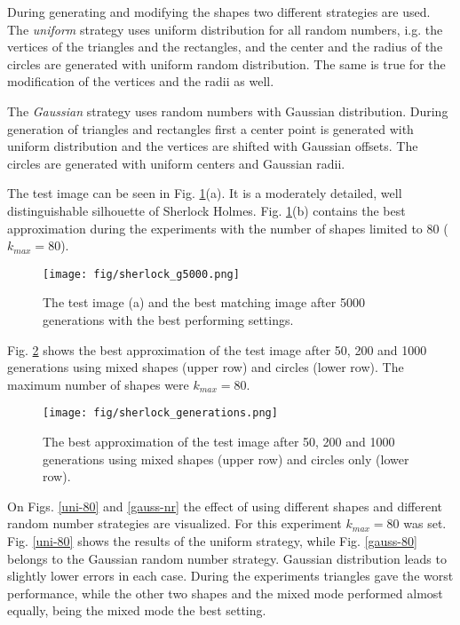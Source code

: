 \documentclass[conference]{IEEEtran}
\begin{document}
During generating and modifying the shapes two different strategies are used. The \emph{uniform}
strategy uses uniform distribution for all random numbers, i.g. the vertices of the triangles
and the rectangles, and the center and the radius of the circles are generated with uniform
random distribution. The same is true for the modification of the vertices and the radii as well.

The \emph{Gaussian} strategy uses random numbers with Gaussian distribution. During generation of
triangles and rectangles first a center point is generated with uniform distribution and the vertices are
shifted with Gaussian offsets. The circles are generated with uniform centers and Gaussian radii.

The test image can be seen in Fig. \ref{sherlock-orig-5000}(a). It is a moderately detailed,
well distinguishable silhouette of Sherlock Holmes. Fig. \ref{sherlock-orig-5000}(b) contains
the best approximation during the experiments with the number of shapes limited to 80 ($k_{max}=80$).

\begin{figure}[htbp]
	\centering
	\texttt{[image: fig/sherlock\_g5000.png]}
  \caption{The test image (a) and the best matching image after 5000 generations with the best
  performing settings.}
	\label{sherlock-orig-5000}
\end{figure}

Fig. \ref{sherlock-generations} shows the best approximation of the test image after 50, 200
and 1000 generations using mixed shapes (upper row) and circles (lower row). The maximum number
of shapes were $k_{max}=80$.

\begin{figure}[htbp]
	\centering
	\texttt{[image: fig/sherlock\_generations.png]}
	\caption{The best approximation of the test image after 50, 200 and 1000 generations using
  mixed shapes (upper row) and circles only (lower row).}
	\label{sherlock-generations}
\end{figure}

On Figs. \ref{uni-80} and \ref{gauss-nr} the effect of using different shapes and
different random number strategies are visualized. For this experiment
$k_{max}=80$ was set. Fig. \ref{uni-80} shows the results of the uniform strategy,
while Fig. \ref{gauss-80} belongs to the Gaussian random number strategy.
Gaussian distribution leads to slightly lower errors in each case. During
the experiments triangles gave the worst performance, while the other two
shapes and the mixed mode performed almost equally, being the mixed mode the best setting.
\end{document}
